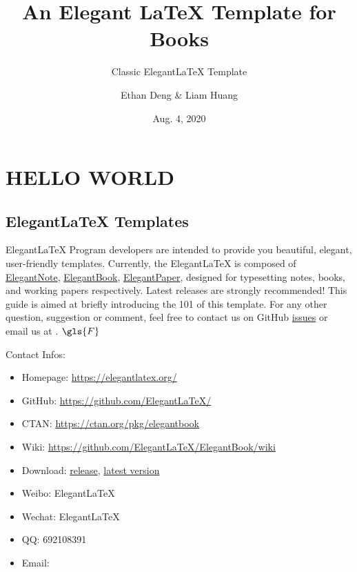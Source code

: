 \documentclass[11pt,fancy,twocol,twoside]{elegantbook}
\title{An Elegant \LaTeX{} Template for Books}
\subtitle{Classic Elegant\LaTeX{} Template}
\author{Ethan Deng \& Liam Huang}
\institute{Elegant\LaTeX{} Program}
\date{Aug. 4, 2020}
\begin{document}
\maketitle

\frontmatter
\tableofcontents

\mainmatter
\printunsrtglossary[type=symbols,style=long]

\part{HELLO WORLD}
\chapter{Elegant\LaTeX{} Templates}
Elegant\LaTeX{} Program developers are intended to provide you beautiful, elegant, user-friendly templates. Currently, the Elegant\LaTeX{} is composed of \href{https://github.com/ElegantLaTeX/ElegantNote}{ElegantNote}, \href{https://github.com/ElegantLaTeX/ElegantBook}{ElegantBook}, \href{https://github.com/ElegantLaTeX/ElegantPaper}{ElegantPaper}, designed for typesetting notes, books, and working papers respectively. Latest releases are strongly recommended! This guide is aimed at briefly introducing the 101 of this template. For any other question, suggestion or comment, feel free to contact us on GitHub \href{https://github.com/ElegantLaTeX/ElegantBook/issues}{issues} or email us at . $\gls{F}$

Contact Infos:
\begin{itemize}
  \item Homepage: \href{https://elegantlatex.org/}{https://elegantlatex.org/}
  \item GitHub: \href{https://github.com/ElegantLaTeX/}{https://github.com/ElegantLaTeX/}
  \item CTAN: \href{https://ctan.org/pkg/elegantbook}{https://ctan.org/pkg/elegantbook}
  \item Wiki: \href{https://github.com/ElegantLaTeX/ElegantBook/wiki}{https://github.com/ElegantLaTeX/ElegantBook/wiki}
  \item Download: \href{https://github.com/ElegantLaTeX/ElegantBook/releases}{release}, \href{https://github.com/ElegantLaTeX/ElegantBook/archive/master.zip}{latest version}
  \item Weibo: Elegant\LaTeX{}
  \item Wechat: Elegant\LaTeX{}
  \item QQ: 692108391
  \item Email: 
\end{itemize}
\end{document}
